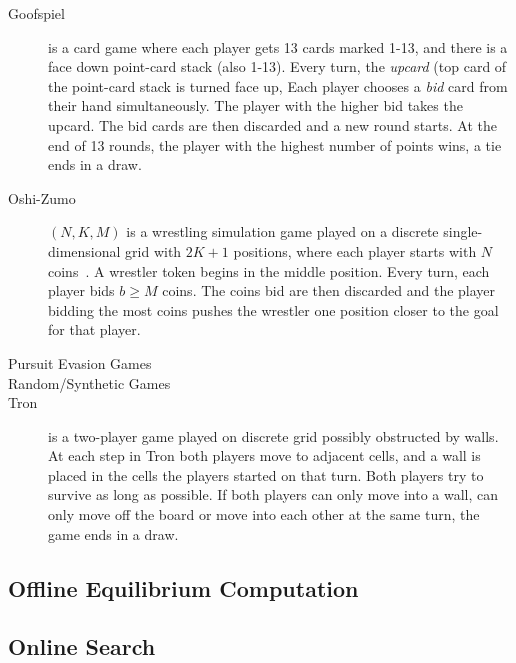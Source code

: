 \begin{description}
\item[Goofspiel] is a card game where each player gets 13 cards marked 1-13, and there is a face down
point-card stack (also 1-13). Every turn, the {\it upcard} (top card of the point-card stack is turned face up,
Each player chooses a {\it bid} card from their hand simultaneously.
The player with the higher bid takes the upcard. The bid cards are then discarded and a new round starts.
At the end of 13 rounds, the player with the highest number of points wins, a tie ends in a draw.

\item[Oshi-Zumo]$(N,K,M)$ is a wrestling simulation game played on a discrete single-dimensional grid with
$2K+1$ positions, where each player starts with $N$ coins~\cite{buro2003}. A wrestler token begins in the middle
position. Every turn,
each player bids $b \ge M$ coins. The coins bid are then discarded and the player bidding the most coins pushes the
wrestler one position closer to the goal for that player. 

\item[Pursuit Evasion Games]

\item[Random/Synthetic Games]

\item[Tron] is a two-player game played on discrete grid possibly obstructed by walls. At each
step in Tron both players move to adjacent cells, and a wall is placed in the cells the players started on that turn.
Both players try to survive as long as possible. If both players can only move into a wall, can only move off the board or move into each other at the same turn, the game ends  in a draw. 
\end{description}

\subsection{Offline Equilibrium Computation}

\subsection{Online Search}



